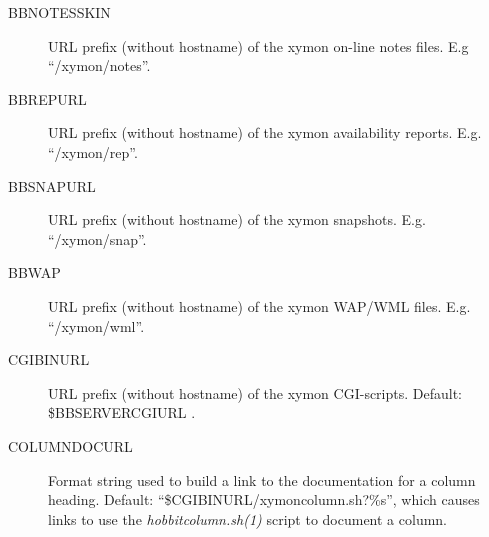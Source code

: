 \begin{description}
 

\item[BBNOTESSKIN] URL prefix (without hostname) of the xymon on-line notes files. E.g ``/xymon/notes''. 

 

\item[BBREPURL] URL prefix (without hostname) of the xymon availability reports. E.g. ``/xymon/rep''. 

 

\item[BBSNAPURL] URL prefix (without hostname) of the xymon snapshots. E.g. ``/xymon/snap''. 

 

\item[BBWAP] URL prefix (without hostname) of the xymon WAP/WML files. E.g. ``/xymon/wml''. 

 

\item[CGIBINURL] URL prefix (without hostname) of the xymon CGI-scripts. Default: \$BBSERVERCGIURL . 

 

\item[COLUMNDOCURL] Format string used to build a link to the documentation for a column heading. Default: ``\$CGIBINURL/xymoncolumn.sh?\%s'', which causes links to use the \emph{hobbitcolumn.sh(1)}
 script to document a column. 

 


 


\end{description}
